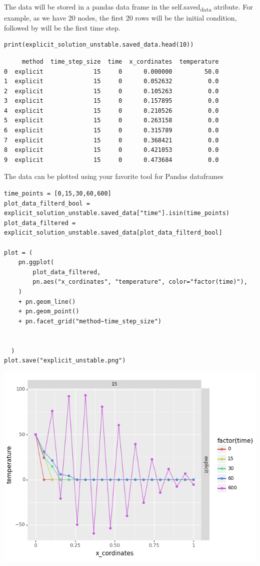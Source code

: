 \documentclass[letterpaper, 11pt]{article}
\begin{document}
The data will be stored in a pandas data frame in the self.saved\textsubscript{data} atribute. For example, as we have 20 nodes, the first 20 rows will be the initial condition, followed by will be the first time step.


\begin{verbatim}
print(explicit_solution_unstable.saved_data.head(10))

\end{verbatim}

\begin{verbatim}
     method  time_step_size  time  x_cordinates  temperature
0  explicit              15     0      0.000000         50.0
1  explicit              15     0      0.052632          0.0
2  explicit              15     0      0.105263          0.0
3  explicit              15     0      0.157895          0.0
4  explicit              15     0      0.210526          0.0
5  explicit              15     0      0.263158          0.0
6  explicit              15     0      0.315789          0.0
7  explicit              15     0      0.368421          0.0
8  explicit              15     0      0.421053          0.0
9  explicit              15     0      0.473684          0.0
\end{verbatim}


The data can be plotted using your favorite tool for Pandas dataframes

\begin{verbatim}
time_points = [0,15,30,60,600]
plot_data_filterd_bool = explicit_solution_unstable.saved_data["time"].isin(time_points)
plot_data_filtered = explicit_solution_unstable.saved_data[plot_data_filterd_bool]

plot = (
    pn.ggplot(
        plot_data_filtered,
        pn.aes("x_cordinates", "temperature", color="factor(time)"),
    )
    + pn.geom_line()
    + pn.geom_point()
    + pn.facet_grid("method~time_step_size")


  )
plot.save("explicit_unstable.png")

\end{verbatim}

\begin{center}
\includegraphics[width=.9\linewidth]{explicit_unstable.png}
\end{center}
\end{document}
